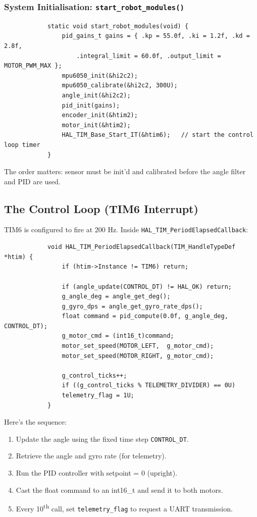 \documentclass[12pt,a4paper]{article}
\begin{document}
		\subsubsection{System Initialisation: \texttt{start\_robot\_modules()}}
		\begin{lstlisting}
			static void start_robot_modules(void) {
				pid_gains_t gains = { .kp = 55.0f, .ki = 1.2f, .kd = 2.8f,
					.integral_limit = 60.0f, .output_limit = MOTOR_PWM_MAX };
				mpu6050_init(&hi2c2);
				mpu6050_calibrate(&hi2c2, 300U);
				angle_init(&hi2c2);
				pid_init(gains);
				encoder_init(&htim2);
				motor_init(&htim2);
				HAL_TIM_Base_Start_IT(&htim6);   // start the control loop timer
			}
		\end{lstlisting}
		The order matters: sensor must be init’d and calibrated before the angle filter and PID are used.
		
		\subsection{The Control Loop (TIM6 Interrupt)}
		TIM6 is configured to fire at 200 Hz. Inside \texttt{HAL\_TIM\_PeriodElapsedCallback}:
		\begin{lstlisting}
			void HAL_TIM_PeriodElapsedCallback(TIM_HandleTypeDef *htim) {
				if (htim->Instance != TIM6) return;
				
				if (angle_update(CONTROL_DT) != HAL_OK) return;
				g_angle_deg = angle_get_deg();
				g_gyro_dps = angle_get_gyro_rate_dps();
				float command = pid_compute(0.0f, g_angle_deg, CONTROL_DT);
				g_motor_cmd = (int16_t)command;
				motor_set_speed(MOTOR_LEFT,  g_motor_cmd);
				motor_set_speed(MOTOR_RIGHT, g_motor_cmd);
				
				g_control_ticks++;
				if ((g_control_ticks % TELEMETRY_DIVIDER) == 0U)
				telemetry_flag = 1U;
			}
		\end{lstlisting}
		Here’s the sequence:
		\begin{enumerate}
			\item Update the angle using the fixed time step \texttt{CONTROL\_DT}.
			\item Retrieve the angle and gyro rate (for telemetry).
			\item Run the PID controller with setpoint = 0 (upright).
			\item Cast the float command to an int16\_t and send it to both motors.
			\item Every 10\textsuperscript{th} call, set \texttt{telemetry\_flag} to request a UART transmission.
		\end{enumerate}
		
\end{document}
